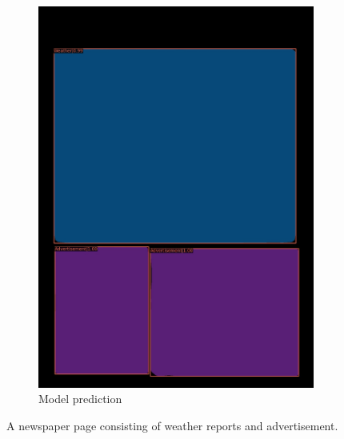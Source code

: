 \documentclass[aspectratio=1610]{beamer}
\begin{document}
\begin{frame}
\begin{figure}
\begin{subfigure}{.25\textwidth}
  \includegraphics[width=0.99\linewidth, clip=true, trim = 0mm 0mm 0mm 0mm]{figures/labels-vanilla-0.75/Jd55Bvg.jpg}
  \caption{Model prediction}
\end{subfigure}
\caption{A newspaper page consisting of weather reports and advertisement.}
\label{fig:weather}
\end{figure}
\end{frame}
\normalpage
\end{document}
